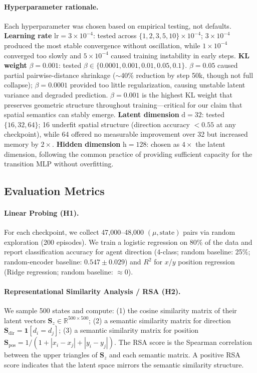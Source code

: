 \documentclass{article}
\begin{document}
\paragraph{Hyperparameter rationale.}
Each hyperparameter was chosen based on empirical testing, not defaults.
\textbf{Learning rate} $\mathrm{lr}=3\times10^{-4}$:
tested across $\{1,2,3,5,10\}\times10^{-4}$;
$3\times10^{-4}$ produced the most stable convergence without oscillation,
while $1\times10^{-4}$ converged too slowly and $5\times10^{-4}$ caused
training instability in early steps.
\textbf{KL weight} $\beta=0.001$:
tested $\beta \in \{0.0001, 0.001, 0.01, 0.05, 0.1\}$.
$\beta=0.05$ caused partial pairwise-distance shrinkage
($\sim$40\% reduction by step 50k, though not full collapse);
$\beta=0.0001$ provided too little regularization, causing
unstable latent variance and degraded prediction.
$\beta=0.001$ is the highest KL weight that preserves geometric
structure throughout training---critical for our claim that
spatial semantics can stably emerge.
\textbf{Latent dimension} $\mathrm{d}=32$:
tested $\{16, 32, 64\}$; 16 underfit spatial structure (direction
accuracy $<0.55$ at any checkpoint), while 64 offered no measurable
improvement over 32 but increased memory by $2\times$.
\textbf{Hidden dimension} $\mathrm{h}=128$: chosen as $4\times$ the
latent dimension, following the common practice of providing
sufficient capacity for the transition MLP without overfitting.

\subsection{Evaluation Metrics}

\paragraph{Linear Probing (H1).}
For each checkpoint, we collect 47{,}000--48{,}000
$(\mu, \text{state})$ pairs via random exploration (200 episodes).
We train a logistic regression on 80\% of the data
and report classification accuracy for agent direction
(4-class; random baseline: 25\%; random-encoder baseline: $0.547\pm0.029$)
and $R^2$ for $x$/$y$ position regression (Ridge regression;
random baseline: $\approx$0).

\paragraph{Representational Similarity Analysis / RSA (H2).}
We sample 500 states and compute:
(1) the cosine similarity matrix of their latent vectors $\mathbf{S}_z \in \mathbb{R}^{500\times500}$;
(2) a semantic similarity matrix for direction
    $\mathbf{S}_{\text{dir}} = \mathbf{1}[d_i = d_j]$;
(3) a semantic similarity matrix for position
    $\mathbf{S}_{\text{pos}} = 1/(1 + |x_i-x_j| + |y_i-y_j|)$.
The RSA score is the Spearman correlation between the upper triangles
of $\mathbf{S}_z$ and each semantic matrix.
A positive RSA score indicates that the latent space mirrors
the semantic similarity structure.
\end{document}
